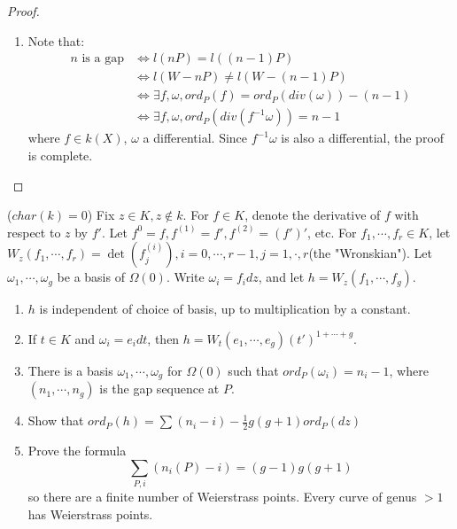 \documentclass{solution}
\begin{document}
\begin{proof}
\begin{enumerate}
        \item Note that:
        $$
            \begin{aligned}
            n \text{ is a gap} &\Leftrightarrow l(nP) = l((n - 1)P) \\
            &\Leftrightarrow l(W - nP) \ne l(W - (n - 1)P) \\
            &\Leftrightarrow \exists f, \omega, ord_P(f) = ord_P (div(\omega)) - (n - 1) \\
            &\Leftrightarrow \exists f, \omega, ord_P(div(f ^{-1} \omega)) = n - 1
            \end{aligned}
        $$
        where $f \in k(X)$, $\omega$ a differential. Since $f ^{-1} \omega$ is also a differential, the proof is complete.
    \end{enumerate}
\end{proof}

\begin{problem}{8.38}
    ($char(k) = 0$) Fix $z \in K, z \notin k$. For $f \in K$, denote the derivative of $f$ with respect to $z$ by $f'$. Let $f^{{0}} = f, f^{(1)} = f', f^{(2)} = (f')'$, etc. For $f_1, \cdots, f_r \in K$, let $W_z(f_1, \cdots, f_r) = \det (f_j^{(i)}), i = 0, \cdots, r - 1, j = 1, \cdotp, r$(the "Wronskian"). Let $\omega_1, \cdots, \omega_g$ be a basis of $\Omega(0)$. Write $\omega_i = f_i dz$, and let $h = W_z(f_1, \cdots, f_g)$.
    \begin{enumerate}
        \item $h$ is independent of choice of basis, up to multiplication by a constant.
        \item If $t \in K$ and $\omega_i = e_i dt$, then $h = W_t(e_1, \cdots, e_g) (t')^{1 + \cdots + g}$.
        \item There is a basis $\omega_1, \cdots, \omega_g$ for $\Omega(0)$ such that $ord_P(\omega_i) = n_i - 1$, where $(n_1, \cdots, n_g)$ is the gap sequence at $P$.
        \item Show that $ord_P(h) = \sum (n_i - i) - \frac{1}{2} g(g + 1) ord_P(dz)$
        \item Prove the formula
        $$\sum\limits_{P, i} (n_i(P) - i) = (g - 1)g(g + 1)$$
        so there are a finite number of Weierstrass points. Every curve of genus $\gt 1$ has Weierstrass points.
    \end{enumerate}
\end{problem}
\end{document}
